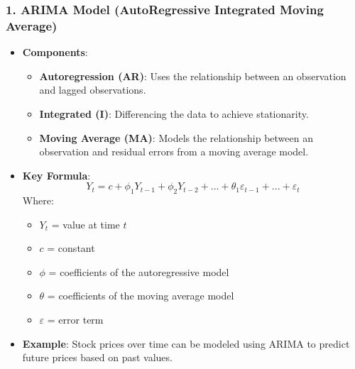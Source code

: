 \documentclass[aspectratio=169]{beamer}
\begin{document}
\begin{frame}[fragile]
    \frametitle{1. ARIMA Model (AutoRegressive Integrated Moving Average)}
    \begin{itemize}
        \item \textbf{Components}:
        \begin{itemize}
            \item \textbf{Autoregression (AR)}: Uses the relationship between an observation and lagged observations.
            \item \textbf{Integrated (I)}: Differencing the data to achieve stationarity.
            \item \textbf{Moving Average (MA)}: Models the relationship between an observation and residual errors from a moving average model.
        \end{itemize}
        \item \textbf{Key Formula}:
        \begin{equation}
            Y_t = c + \phi_1 Y_{t-1} + \phi_2 Y_{t-2} + ... + \theta_1 \varepsilon_{t-1} + ... + \varepsilon_t
        \end{equation}
        Where:
        \begin{itemize}
            \item $Y_t$ = value at time $t$
            \item $c$ = constant
            \item $\phi$ = coefficients of the autoregressive model
            \item $\theta$ = coefficients of the moving average model
            \item $\varepsilon$ = error term
        \end{itemize}
        \item \textbf{Example}: Stock prices over time can be modeled using ARIMA to predict future prices based on past values.
    \end{itemize}
\end{frame}
\end{document}
